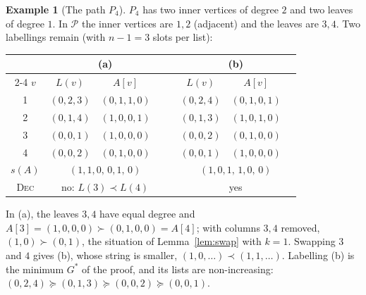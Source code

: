 \documentclass[11pt,a4paper]{article}
\theoremstyle{definition}
\newtheorem{example}[theorem]{Example}
\theoremstyle{remark}
\newcommand{\slex}{\prec}
\newcommand{\Lst}{L}
\begin{document}
\begin{example}[The path $P_4$]
$P_4$ has two inner vertices of degree $2$ and two leaves of degree $1$. In $\mathcal{P}$ the
inner vertices are $1,2$ (adjacent) and the leaves are $3,4$. Two labellings remain
(with $n-1=3$ slots per list):

\begin{center}
\end{center}

\begin{center}
\begin{tabular}{c ccc c ccc}
\toprule
 & \multicolumn{3}{c}{(a)} & & \multicolumn{3}{c}{(b)}\\
\cmidrule{2-4}\cmidrule{6-8}
$v$ & $\Lst(v)$ & $A[v]$ & & & $\Lst(v)$ & $A[v]$ & \\
\midrule
1 & $(0,2,3)$ & $(0,1,1,0)$ & & & $(0,2,4)$ & $(0,1,0,1)$ & \\
2 & $(0,1,4)$ & $(1,0,0,1)$ & & & $(0,1,3)$ & $(1,0,1,0)$ & \\
3 & $(0,0,1)$ & $(1,0,0,0)$ & & & $(0,0,2)$ & $(0,1,0,0)$ & \\
4 & $(0,0,2)$ & $(0,1,0,0)$ & & & $(0,0,1)$ & $(1,0,0,0)$ & \\
\midrule
$s(A)$ & \multicolumn{3}{c}{$(1,1,0,\,0,1,\,0)$} & & \multicolumn{3}{c}{$(1,0,1,\,1,0,\,0)$}\\
\textsc{Dec} & \multicolumn{3}{c}{\color{red}no: $\Lst(3)\slex\Lst(4)$}
 & & \multicolumn{3}{c}{\color{teal}yes}\\
\bottomrule
\end{tabular}
\end{center}

In (a), the leaves $3,4$ have equal degree and $A[3]=(1,0,0,0)\succ(0,1,0,0)=A[4]$; with
columns $3,4$ removed, $(1,0)\succ(0,1)$, the situation of Lemma~\ref{lem:swap} with $k=1$.
Swapping $3$ and $4$ gives (b), whose string is smaller,
$(1,0,\dots)\slex(1,1,\dots)$. Labelling (b) is the minimum $G^\ast$ of the proof, and its
lists are non-increasing: $(0,2,4)\succeq(0,1,3)\succeq(0,0,2)\succeq(0,0,1)$.
\end{example}
\end{document}
